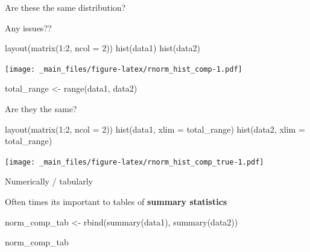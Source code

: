 \documentclass[
]{book}
\newenvironment{Shaded}{\begin{snugshade}}{\end{snugshade}}
\newcommand{\AttributeTok}[1]{\textcolor[rgb]{0.77,0.63,0.00}{#1}}
\newcommand{\DecValTok}[1]{\textcolor[rgb]{0.00,0.00,0.81}{#1}}
\newcommand{\FunctionTok}[1]{\textcolor[rgb]{0.00,0.00,0.00}{#1}}
\newcommand{\NormalTok}[1]{#1}
\newcommand{\OtherTok}[1]{\textcolor[rgb]{0.56,0.35,0.01}{#1}}
\newcommand{\SpecialCharTok}[1]{\textcolor[rgb]{0.00,0.00,0.00}{#1}}
\begin{document}
Are these the same distribution?

Any issues??

\begin{Shaded}
\begin{Highlighting}[]
\FunctionTok{layout}\NormalTok{(}\FunctionTok{matrix}\NormalTok{(}\DecValTok{1}\SpecialCharTok{:}\DecValTok{2}\NormalTok{, }\AttributeTok{ncol =} \DecValTok{2}\NormalTok{))}
\FunctionTok{hist}\NormalTok{(data1)}
\FunctionTok{hist}\NormalTok{(data2)}
\end{Highlighting}
\end{Shaded}

\texttt{[image: \_main\_files/figure-latex/rnorm\_hist\_comp-1.pdf]}

\begin{Shaded}
\begin{Highlighting}[]
\NormalTok{total\_range }\OtherTok{\textless{}{-}} \FunctionTok{range}\NormalTok{(data1, data2)}
\end{Highlighting}
\end{Shaded}

Are they the same?

\begin{Shaded}
\begin{Highlighting}[]
\FunctionTok{layout}\NormalTok{(}\FunctionTok{matrix}\NormalTok{(}\DecValTok{1}\SpecialCharTok{:}\DecValTok{2}\NormalTok{, }\AttributeTok{ncol =} \DecValTok{2}\NormalTok{))}
\FunctionTok{hist}\NormalTok{(data1, }\AttributeTok{xlim =}\NormalTok{ total\_range)}
\FunctionTok{hist}\NormalTok{(data2, }\AttributeTok{xlim =}\NormalTok{ total\_range)}
\end{Highlighting}
\end{Shaded}

\texttt{[image: \_main\_files/figure-latex/rnorm\_hist\_comp\_true-1.pdf]}

Numerically / tabularly

Often times its important to tables of \textbf{summary statistics}

\begin{Shaded}
\begin{Highlighting}[]
\NormalTok{norm\_comp\_tab }\OtherTok{\textless{}{-}} \FunctionTok{rbind}\NormalTok{(}\FunctionTok{summary}\NormalTok{(data1),}
                       \FunctionTok{summary}\NormalTok{(data2))}

\NormalTok{norm\_comp\_tab}
\end{Highlighting}
\end{Shaded}
\end{document}
